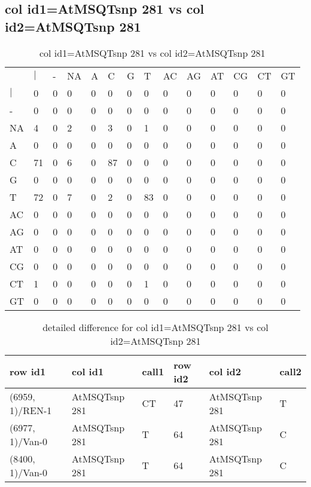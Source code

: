\subsection{col id1=AtMSQTsnp 281 vs col id2=AtMSQTsnp 281}
\begin{center}
\begin{longtable}{|l|l|l|l|l|l|l|l|l|l|l|l|l|l|}
\caption{col id1=AtMSQTsnp 281 vs col id2=AtMSQTsnp 281} \label{table_dm816}\\
\hline
\\
\hline
&$|$&-&NA&A&C&G&T&AC&AG&AT&CG&CT&GT\\
$|$&0&0&0&0&0&0&0&0&0&0&0&0&0\\
-&0&0&0&0&0&0&0&0&0&0&0&0&0\\
NA&4&0&2&0&3&0&1&0&0&0&0&0&0\\
A&0&0&0&0&0&0&0&0&0&0&0&0&0\\
C&71&0&6&0&87&0&0&0&0&0&0&0&0\\
G&0&0&0&0&0&0&0&0&0&0&0&0&0\\
T&72&0&7&0&2&0&83&0&0&0&0&0&0\\
AC&0&0&0&0&0&0&0&0&0&0&0&0&0\\
AG&0&0&0&0&0&0&0&0&0&0&0&0&0\\
AT&0&0&0&0&0&0&0&0&0&0&0&0&0\\
CG&0&0&0&0&0&0&0&0&0&0&0&0&0\\
CT&1&0&0&0&0&0&1&0&0&0&0&0&0\\
GT&0&0&0&0&0&0&0&0&0&0&0&0&0\\
\hline
\end{longtable}
\end{center}

\begin{center}
\begin{longtable}{|l|l|l|l|l|l|}
\caption{detailed difference for col id1=AtMSQTsnp 281 vs col id2=AtMSQTsnp 281} \label{table_dm817}\\
\hline
row id1&col id1&call1&row id2&col id2&call2\\
\hline
(6959, 1)/REN-1&AtMSQTsnp 281&CT&47&AtMSQTsnp 281&T\\
(6977, 1)/Van-0&AtMSQTsnp 281&T&64&AtMSQTsnp 281&C\\
(8400, 1)/Van-0&AtMSQTsnp 281&T&64&AtMSQTsnp 281&C\\
\hline
\end{longtable}
\end{center}

